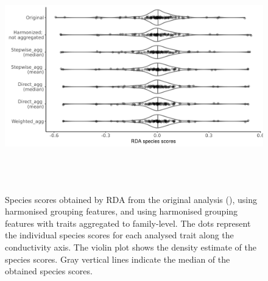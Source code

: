 \documentclass{article}
\begin{document}
\begin{figure}[H]
    \centering
    \includegraphics[width=16.5cm, height=10cm]{Species_scores_rda.png}
    \caption{Species scores obtained by RDA from the original analysis (\cite{szocs_effects_2014}), using harmonised grouping features, and using harmonised grouping features with traits aggregated to family-level. The dots represent the individual species scores for each analysed trait along the conductivity axis. The violin plot shows the density estimate of the species scores. Gray vertical lines indicate the median of the obtained species scores.}
    \label{fig:violin_plot_species_sc}
\end{figure}

\end{document}
